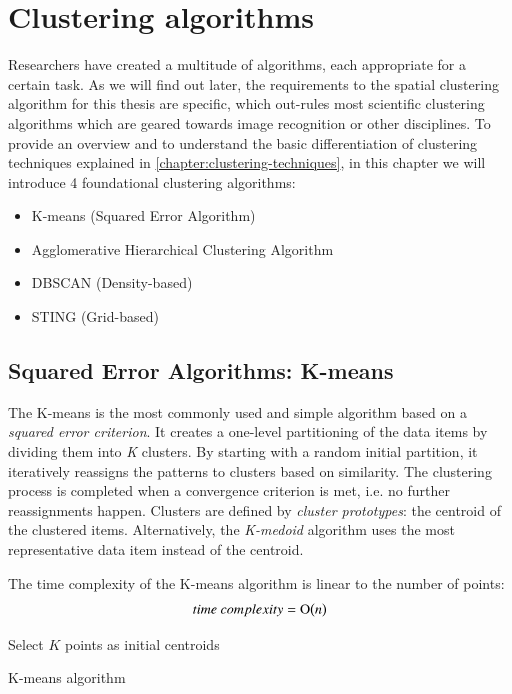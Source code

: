 
%
%

\section{Clustering algorithms}

Researchers have created a multitude of algorithms, each appropriate for a certain task. As we will find out later, the requirements to the spatial clustering algorithm for this thesis are specific, which out-rules most scientific clustering algorithms which are geared towards image recognition or other disciplines. To provide an overview and to understand the basic differentiation of clustering techniques explained in \ref{chapter:clustering-techniques}, in this chapter we will introduce 4 foundational clustering algorithms:

\begin{itemize}
\item {K-means (Squared Error Algorithm)}
\item {Agglomerative Hierarchical Clustering Algorithm}
\item {DBSCAN (Density-based)}
\item {STING (Grid-based)}
\end{itemize}

\subsection{Squared Error Algorithms: K-means}
\label{chapter:k-means}

The K-means is the most commonly used and simple algorithm based on a \textit{squared error criterion}. It creates a one-level partitioning of the data items by dividing them into \textit{K} clusters. By starting with a random initial partition, it iteratively reassigns the patterns to clusters based on similarity.  The clustering process is completed when a convergence criterion is met, i.e. no further reassignments happen. Clusters are defined by \textit{cluster prototypes}: the centroid of the clustered items. Alternatively, the \textit{K-medoid} algorithm uses the most representative data item instead of the centroid.

The time complexity of the K-means algorithm is linear to the number of points:
\[time~complexity = \operatorname{O}\bigl(n\bigr)\]

\begin{algorithm}[t]
  \BlankLine
  {Select $K$ points as initial centroids}\;
  \caption{K-means algorithm~\cite{Meert06clustermaps}}
  \label{alg:k-means}
\end{algorithm}

